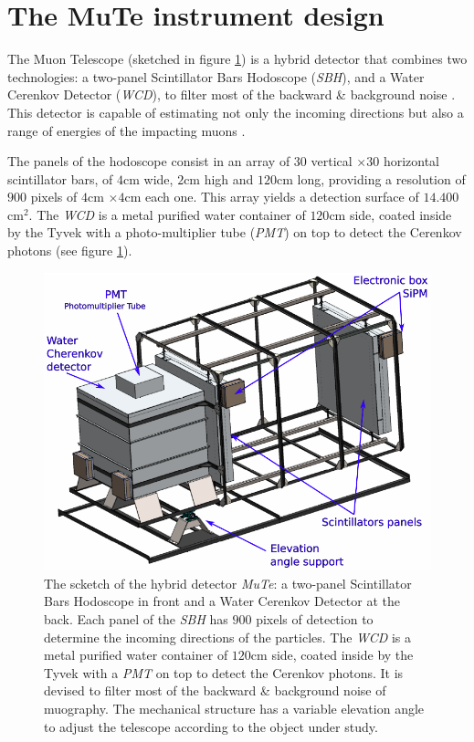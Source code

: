 \documentclass[submitting]{nst}
\begin{document}

\section{The MuTe instrument design}
The Muon Telescope (sketched in figure \ref{fig:mute-detector}) is a hybrid detector that combines two technologies: a two-panel Scintillator Bars Hodoscope (\textsl{SBH}),  and a Water Cerenkov Detector (\textsl{WCD}), to filter most of the backward \& background noise \cite{NishiyamaMiyamotoNaganawa2014, KusagayaTanaka2015, NishiyamaEtal2016, GomezEtal2017}. This detector is capable of estimating not only the incoming  directions but also a range of energies of the impacting muons \cite{AsoreyEtal2017B}.
  
 The panels of the hodoscope consist in an array of $30$ vertical $\times 30$ horizontal scintillator bars, of $4$cm wide, $2$cm high and $120$cm long, providing a resolution of $900$ pixels of $4$cm $\times 4$cm each one. This array yields a detection surface of $14.400$cm$^2$. The \textsl{WCD} is a metal purified water container of $120$cm side, coated inside by the Tyvek with a photo-multiplier tube (\textsl{PMT}) on top to detect the Cerenkov photons (see figure \ref{fig:mute-detector}).

\begin{figure}
    \centering
    \includegraphics[scale=0.3]{Figures/mute-detector.png}
    \caption{The scketch of the hybrid detector \textsl{MuTe}: a two-panel Scintillator Bars Hodoscope in front and a Water Cerenkov Detector at the back. Each panel of the \textsl{SBH} has $900$ pixels of detection to determine the incoming directions of the particles. The \textsl{WCD} is a metal purified water container of $120$cm side, coated inside by the Tyvek with a \textsl{PMT} on top to detect the Cerenkov photons. It is devised to filter most of the backward \& background noise of muography. The mechanical structure has a variable elevation angle to adjust the telescope according to the object under study.} 
    \label{fig:mute-detector}
\end{figure}
\end{document}
